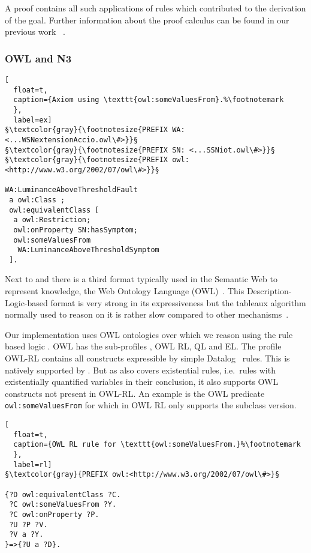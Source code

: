 A proof contains all such applications of rules which contributed to the derivation of the goal.
Further information about the proof calculus 
can be found in our previous work%
~\cite{pragmaticproof}.





\subsubsection{OWL and N3} \label{owln3}
\begin{lstlisting}[
  float=t,
  caption={Axiom using \texttt{owl:someValuesFrom}.%\footnotemark
  },
  label=ex]  
§\textcolor{gray}{\footnotesize{PREFIX WA: <...WSNextensionAccio.owl\#>}}§
§\textcolor{gray}{\footnotesize{PREFIX SN: <...SSNiot.owl\#>}}§
§\textcolor{gray}{\footnotesize{PREFIX owl:<http://www.w3.org/2002/07/owl\#>}}§

WA:LuminanceAboveThresholdFault 
 a owl:Class ;
 owl:equivalentClass [ 
  a owl:Restriction;
  owl:onProperty SN:hasSymptom;
  owl:someValuesFrom 
   WA:LuminanceAboveThresholdSymptom 
 ].
\end{lstlisting}
Next to \nthree and \rdf there is a third format typically used in the Semantic Web to represent knowledge, the Web Ontology Language (OWL)~\cite{owl}.
This Description-Logic-based format is very strong in its expressiveness but the tableaux algorithm normally used to reason 
on it is rather slow compared to other mechanisms~\cite{Krötzsch2012,arndt_ruleml_industry_2015}.

Our implementation uses OWL ontologies  
over which we reason using the rule based logic \nthree.
OWL has the sub-profiles \cite{OWLRL}, OWL RL, QL and EL.
%
The profile OWL-RL contains all constructs expressible by simple Datalog~\cite{datalog} rules. This is natively supported by \nthree  \cite{arndt_owled_2015}. 
But as \nthree 
also covers existential rules, i.e.\ rules with existentially quantified variables in
their conclusion, it also supports OWL constructs not present in OWL-RL.  An example is the OWL predicate \texttt{owl:someValuesFrom}
for which in OWL RL only supports the subclass version. %
\begin{lstlisting}[
  float=t,
  caption={OWL RL rule for \texttt{owl:someValuesFrom.}%\footnotemark
  },
  label=rl]
§\textcolor{gray}{PREFIX owl:<http://www.w3.org/2002/07/owl\#>}§

{?D owl:equivalentClass ?C.
 ?C owl:someValuesFrom ?Y. 
 ?C owl:onProperty ?P. 
 ?U ?P ?V.
 ?V a ?Y.
}=>{?U a ?D}.
 \end{lstlisting}


